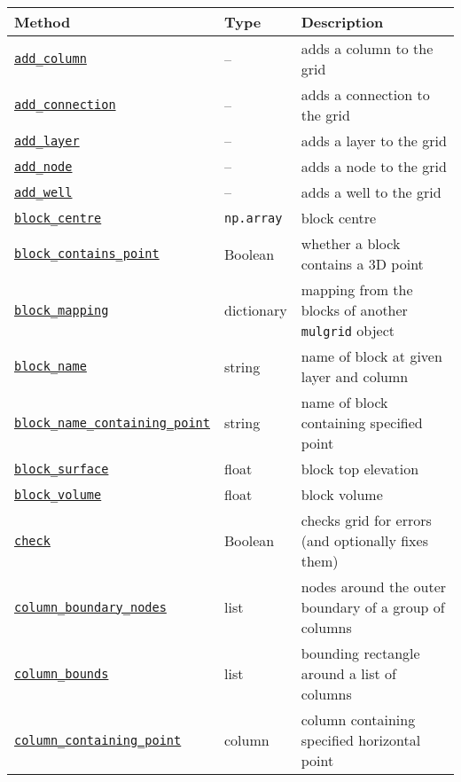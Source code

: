 \begin{center}
\begin{longtable}{|l|l|p{70mm}|}
  \hline
  \textbf{Method} & \textbf{Type} & \textbf{Description}\\
  \hline
  \hyperref[sec:mulgrid:add_column]{\texttt{add\_column}} & -- & adds a column to the grid\\ 
  \hyperref[sec:mulgrid:add_connection]{\texttt{add\_connection}} & -- & adds a connection to the grid\\ 
  \hyperref[sec:mulgrid:add_layer]{\texttt{add\_layer}} & -- & adds a layer to the grid\\ 
  \hyperref[sec:mulgrid:add_node]{\texttt{add\_node}} & -- & adds a node to the grid\\ 
  \hyperref[sec:mulgrid:add_well]{\texttt{add\_well}} & -- & adds a well to the grid\\ 
  \hyperref[sec:mulgrid:block_centre]{\texttt{block\_centre}} & \texttt{np.array} & block centre\\
  \hyperref[sec:mulgrid:block_contains_point]{\texttt{block\_contains\_point}} & Boolean & whether a block contains a 3D point\\
  \hyperref[sec:mulgrid:block_mapping]{\texttt{block\_mapping}} & dictionary & mapping from the blocks of another \texttt{mulgrid} object\\
  \hyperref[sec:mulgrid:block_name]{\texttt{block\_name}} & string & name of block at given layer and column\\
  \hyperref[sec:mulgrid:block_name_containing_point]{\texttt{block\_name\_containing\_point}} & string & name of block containing specified point\\
  \hyperref[sec:mulgrid:block_surface]{\texttt{block\_surface}} & float & block top elevation\\
  \hyperref[sec:mulgrid:block_volume]{\texttt{block\_volume}} & float & block volume\\
  \hyperref[sec:mulgrid:check]{\texttt{check}} & Boolean & checks grid for errors (and optionally fixes them)\\ 
  \hyperref[sec:mulgrid:column_boundary_nodes]{\texttt{column\_boundary\_nodes}} & list & nodes around the outer boundary of a group of columns\\ 
  \hyperref[sec:mulgrid:column_bounds]{\texttt{column\_bounds}} & list & bounding rectangle around a list of columns\\ 
  \hyperref[sec:mulgrid:column_containing_point]{\texttt{column\_containing\_point}} & column & column containing specified horizontal point\\ 

\end{longtable}
\end{center}
